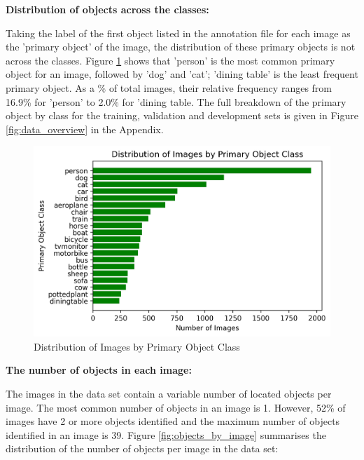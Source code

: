 \documentclass{article}
\begin{document}
\textbf{Distribution of objects across the classes:}

Taking the label of the first object listed in the annotation file for each image as the 'primary object' of the image, the distribution of these primary objects is not across the classes. Figure \ref{fig:image_by_class} shows that 'person' is the most common primary object for an image, followed by 'dog' and 'cat'; 'dining table' is the least frequent primary object. As a \% of total images, their relative frequency ranges from 16.9\% for 'person' to 2.0\% for 'dining table. The full breakdown of the primary object by class for the training, validation and development sets is given in Figure \ref{fig:data_overview} in the Appendix.

\begin{figure}[h]
  \includegraphics[scale = 0.7]{bar_channels.jpg}
  \centering
  \caption{Distribution of Images by Primary Object Class}
  \label{fig:image_by_class}
\end{figure}


\textbf{The number of objects in each image:}

The images in the data set contain a variable number of located objects per image. The most common number of objects in an image is 1. However, 52\% of images have 2 or more objects identified and the maximum number of objects identified in an image is 39. Figure \ref{fig:objects_by_image} summarises the distribution of the number of objects per image in the data set:
\end{document}
